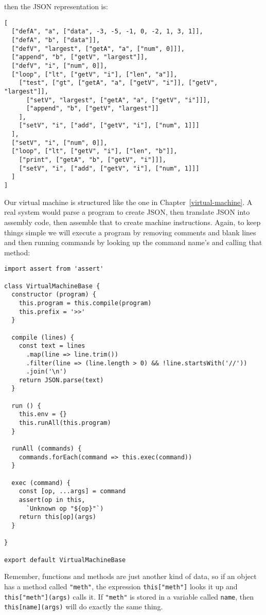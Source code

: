 \documentclass[krantzl]{krantz}
\newcommand{\chapref}[1]{Chapter~\ref{#1}}
\begin{document}
\noindent then the JSON representation is:


\begin{lstlisting}[frame=tblr]
[
  ["defA", "a", ["data", -3, -5, -1, 0, -2, 1, 3, 1]],
  ["defA", "b", ["data"]],
  ["defV", "largest", ["getA", "a", ["num", 0]]],
  ["append", "b", ["getV", "largest"]],
  ["defV", "i", ["num", 0]],
  ["loop", ["lt", ["getV", "i"], ["len", "a"]],
    ["test", ["gt", ["getA", "a", ["getV", "i"]], ["getV", "largest"]],
      ["setV", "largest", ["getA", "a", ["getV", "i"]]],
      ["append", "b", ["getV", "largest"]]
    ],
    ["setV", "i", ["add", ["getV", "i"], ["num", 1]]]
  ],
  ["setV", "i", ["num", 0]],
  ["loop", ["lt", ["getV", "i"], ["len", "b"]],
    ["print", ["getA", "b", ["getV", "i"]]],
    ["setV", "i", ["add", ["getV", "i"], ["num", 1]]]
  ]
]
\end{lstlisting}



Our virtual machine is structured like the one in \chapref{virtual-machine}.
A real system would parse a program to create JSON,
then translate JSON into assembly code,
then assemble that to create machine instructions.
Again,
to keep things simple we will execute a program by
removing comments and blank lines
and then running commands by looking up the command name’s and calling that method:


\begin{lstlisting}[frame=tblr]
import assert from 'assert'

class VirtualMachineBase {
  constructor (program) {
    this.program = this.compile(program)
    this.prefix = '>>'
  }

  compile (lines) {
    const text = lines
      .map(line => line.trim())
      .filter(line => (line.length > 0) && !line.startsWith('//'))
      .join('\n')
    return JSON.parse(text)
  }

  run () {
    this.env = {}
    this.runAll(this.program)
  }

  runAll (commands) {
    commands.forEach(command => this.exec(command))
  }

  exec (command) {
    const [op, ...args] = command
    assert(op in this,
      `Unknown op "${op}"`)
    return this[op](args)
  }

}

export default VirtualMachineBase
\end{lstlisting}



\noindent Remember, functions and methods are just another kind of data,
so if an object has a method called \texttt{"meth"},
the expression \texttt{this["meth"]} looks it up
and \texttt{this["meth"](args)} calls it.
If \texttt{"meth"} is stored in a variable called \texttt{name},
then \texttt{this[name](args)} will do exactly the same thing.
\end{document}
